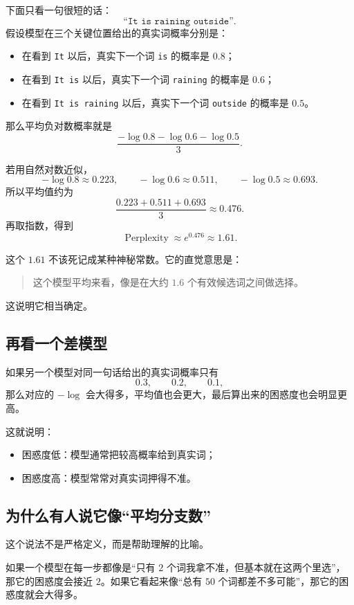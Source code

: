 \documentclass[12pt,a4paper]{ctexart}
\begin{document}
下面只看一句很短的话：
\[
\texttt{``It is raining outside''}.
\]
假设模型在三个关键位置给出的真实词概率分别是：
\begin{itemize}
  \item 在看到 \texttt{It} 以后，真实下一个词 \texttt{is} 的概率是 \(0.8\)；
  \item 在看到 \texttt{It is} 以后，真实下一个词 \texttt{raining} 的概率是 \(0.6\)；
  \item 在看到 \texttt{It is raining} 以后，真实下一个词 \texttt{outside} 的概率是 \(0.5\)。
\end{itemize}

那么平均负对数概率就是
\[
\frac{
-\log 0.8 - \log 0.6 - \log 0.5
}{3}.
\]

若用自然对数近似，
\[
-\log 0.8 \approx 0.223,\qquad
-\log 0.6 \approx 0.511,\qquad
-\log 0.5 \approx 0.693.
\]
所以平均值约为
\[
\frac{0.223 + 0.511 + 0.693}{3}
\approx 0.476.
\]
再取指数，得到
\[
\operatorname{Perplexity}
\approx
e^{0.476}
\approx
1.61.
\]

这个 \(1.61\) 不该死记成某种神秘常数。它的直觉意思是：
\begin{quote}
这个模型平均来看，像是在大约 \(1.6\) 个有效候选词之间做选择。
\end{quote}
这说明它相当确定。

\subsection{再看一个差模型}

如果另一个模型对同一句话给出的真实词概率只有
\[
0.3,\qquad 0.2,\qquad 0.1,
\]
那么对应的 \(-\log\) 会大得多，平均值也会更大，最后算出来的困惑度也会明显更高。

这就说明：
\begin{itemize}
  \item 困惑度低：模型通常把较高概率给到真实词；
  \item 困惑度高：模型常常对真实词押得不准。
\end{itemize}

\subsection{为什么有人说它像“平均分支数”}

这个说法不是严格定义，而是帮助理解的比喻。

如果一个模型在每一步都像是“只有 \(2\) 个词我拿不准，但基本就在这两个里选”，那它的困惑度会接近 \(2\)。如果它看起来像“总有 \(50\) 个词都差不多可能”，那它的困惑度就会大得多。
\end{document}

